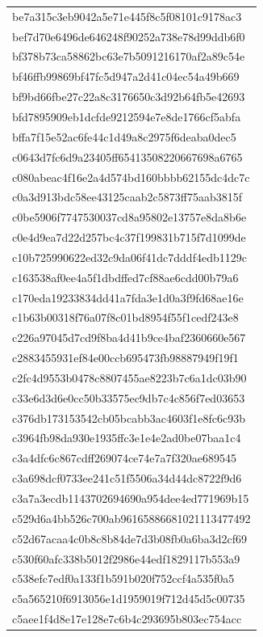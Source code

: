 \begin{tabular}{l}
be7a315c3eb9042a5e71e445f8c5f08101c9178ac3 \\
bef7d70e6496de646248f90252a738e78d99ddb6f0 \\
bf378b73ca58862bc63e7b5091216170af2a89c54e \\
bf46ffb99869bf47fc5d947a2d41c04ec54a49b669 \\
bf9bd66fbe27c22a8c3176650c3d92b64fb5e42693 \\
bfd7895909eb1dcfde9212594e7e8de1766cf5abfa \\
bffa7f15e52ac6fe44c1d49a8c2975f6deaba0dec5 \\
c0643d7fc6d9a23405ff65413508220667698a6765 \\
c080abeac4f16e2a4d574bd160bbbb62155dc4dc7c \\
c0a3d913bdc58ee43125caab2c5873ff75aab3815f \\
c0be5906f7747530037cd8a95802e13757e8da8b6e \\
c0e4d9ea7d22d257bc4c37f199831b715f7d1099de \\
c10b725990622ed32c9da06f41dc7dddf4edb1129c \\
c163538af0ee4a5f1dbdffed7cf88ae6cdd00b79a6 \\
c170eda19233834dd41a7fda3e1d0a3f9fd68ae16e \\
c1b63b00318f76a07f8c01bd8954f55f1cedf243e8 \\
c226a97045d7cd9f8ba4d41b9ce4baf2360660e567 \\
c2883455931ef84e00ccb695473fb98887949f19f1 \\
c2fc4d9553b0478c8807455ae8223b7c6a1dc03b90 \\
c33e6d3d6e0cc50b33575ec9db7c4c856f7ed03653 \\
c376db173153542cb05bcabb3ac4603f1e8fc6c93b \\
c3964fb98da930e1935ffc3e1e4e2ad0be07baa1c4 \\
c3a4dfc6c867cdff269074ce74e7a7f320ae689545 \\
c3a698dcf0733ee241c51f5506a34d44dc8722f9d6 \\
c3a7a3ecdb1143702694690a954dee4ed771969b15 \\
c529d6a4bb526c700ab96165886681021113477492 \\
c52d67acaa4c0b8c8b84de7d3b08fb0a6ba3d2cf69 \\
c530f60afc338b5012f2986e44edf1829117b553a9 \\
c538efc7edf0a133f1b591b020f752ccf4a535f0a5 \\
c5a565210f6913056e1d1959019f712d45d5c00735 \\
c5aee1f4d8e17e128e7c6b4c293695b803ec754acc \\

\end{tabular}
